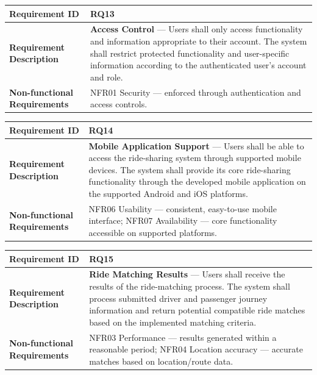 \begin{minipage}{\textwidth}
\small
\begin{tabular}{|>{\raggedright\arraybackslash}p{}|>{\raggedright\arraybackslash}p{}|}
\hline
\textbf{Requirement ID} & RQ13 \\
\hline
\textbf{Requirement Description} & \textbf{Access Control} --- Users shall only access functionality and information appropriate to their account. The system shall restrict protected functionality and user-specific information according to the authenticated user's account and role. \\
\hline
\textbf{Non-functional Requirements} & NFR01 Security --- enforced through authentication and access controls. \\
\hline
\end{tabular}
\end{minipage}
\medskip
 
\begin{minipage}{\textwidth}
\small
\begin{tabular}{|>{\raggedright\arraybackslash}p{}|>{\raggedright\arraybackslash}p{}|}
\hline
\textbf{Requirement ID} & RQ14 \\
\hline
\textbf{Requirement Description} & \textbf{Mobile Application Support} --- Users shall be able to access the ride-sharing system through supported mobile devices. The system shall provide its core ride-sharing functionality through the developed mobile application on the supported Android and iOS platforms. \\
\hline
\textbf{Non-functional Requirements} & NFR06 Usability --- consistent, easy-to-use mobile interface; \newline NFR07 Availability --- core functionality accessible on supported platforms. \\
\hline
\end{tabular}
\end{minipage}
\medskip
 
\begin{minipage}{\textwidth}
\small
\begin{tabular}{|>{\raggedright\arraybackslash}p{}|>{\raggedright\arraybackslash}p{}|}
\hline
\textbf{Requirement ID} & RQ15 \\
\hline
\textbf{Requirement Description} & \textbf{Ride Matching Results} --- Users shall receive the results of the ride-matching process. The system shall process submitted driver and passenger journey information and return potential compatible ride matches based on the implemented matching criteria. \\
\hline
\textbf{Non-functional Requirements} & NFR03 Performance --- results generated within a reasonable period; \newline NFR04 Location accuracy --- accurate matches based on location/route data. \\
\hline
\end{tabular}
\end{minipage}
\medskip
 
